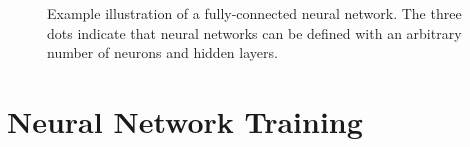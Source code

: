 




\begin{figure}[t]
    \caption{Example illustration of a fully-connected neural network. The three dots indicate that neural networks can be defined with an arbitrary number of neurons and hidden layers.}
    \label{fig:neural-net}
\end{figure}




\section{Neural Network Training}
\label{sec:nn-training}



